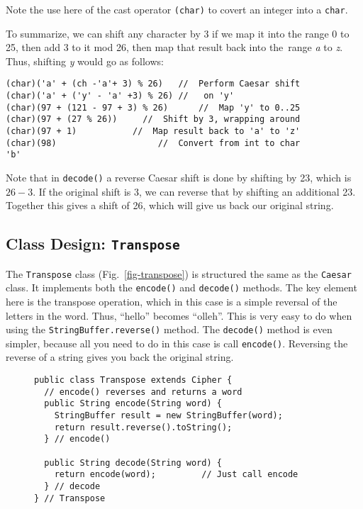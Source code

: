 \noindent Note the use here of the cast operator {\tt (char)} to
covert an integer into a {\tt char}.

To summarize, we can shift any character by 3 if we map it into the
range 0 to 25, then add 3 to it mod 26, then map that result back into
the~range {\it a} to {\it z}. Thus, shifting {\it y} would go as follows:

\begin{jjjlisting}
\begin{lstlisting}
(char)('a' + (ch -'a'+ 3) % 26)   //  Perform Caesar shift
(char)('a' + ('y' - 'a' +3) % 26) //   on 'y'
(char)(97 + (121 - 97 + 3) % 26)      //  Map 'y' to 0..25
(char)(97 + (27 % 26))     //  Shift by 3, wrapping around
(char)(97 + 1)           //  Map result back to 'a' to 'z'
(char)(98)                    //  Convert from int to char
'b'
\end{lstlisting}
\end{jjjlisting}

\noindent  Note that in {\tt decode()} a reverse
Caesar shift is done by shifting by 23, which is $26-3$. If the original
shift is 3, we can reverse that by shifting an additional 23. Together
this gives a shift of 26, which will give us back our original string.

\subsection{Class Design: {\tt Transpose} }
\noindent The {\tt Transpose} class (Fig.~\ref{fig-transpose}) is
structured the same as the {\tt Caesar} class.  It implements both the
{\tt encode()} and {\tt decode()} methods.  The key element here is
the transpose operation, which in this case is a simple reversal of
the letters in the word.  Thus, ``hello'' becomes ``olleh''.  This is
very easy to do when using the {\tt StringBuffer.reverse()} method.  The
{\tt decode()} method is even simpler, because all you need to do in
this case is call {\tt encode()}. Reversing the reverse of a string
gives you back the original string.

\begin{figure}[h!]
\jjjprogstart
\begin{jjjlisting}
\begin{lstlisting}
public class Transpose extends Cipher {
  // encode() reverses and returns a word
  public String encode(String word) {
    StringBuffer result = new StringBuffer(word);
    return result.reverse().toString(); 
  } // encode()

  public String decode(String word) {
    return encode(word);         // Just call encode
  } // decode
} // Transpose
\end{lstlisting}
\end{jjjlisting}
\end{figure}

